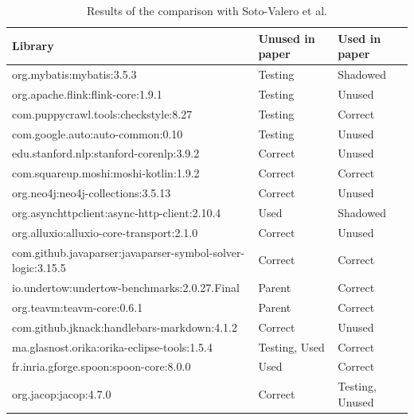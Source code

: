 \begin{table}[ht!]
\begin{center}
\begin{tabular}{|l|l|l|}
\hline
\textbf{Library} & \textbf{Unused in paper} & \textbf{Used in paper} \\ \hline
org.mybatis:mybatis:3.5.3                                   & Testing       & Shadowed        \\ \hline
org.apache.flink:flink-core:1.9.1                           & Testing       & Unused          \\ \hline
com.puppycrawl.tools:checkstyle:8.27                        & Testing       & Correct         \\ \hline
com.google.auto:auto-common:0.10                            & Testing       & Unused          \\ \hline
edu.stanford.nlp:stanford-corenlp:3.9.2                     & Correct       & Unused          \\ \hline
com.squareup.moshi:moshi-kotlin:1.9.2                       & Correct       & Correct         \\ \hline
org.neo4j:neo4j-collections:3.5.13                          & Correct       & Unused          \\ \hline
org.asynchttpclient:async-http-client:2.10.4                & Used          & Shadowed        \\ \hline
org.alluxio:alluxio-core-transport:2.1.0                    & Correct       & Unused          \\ \hline
com.github.javaparser:javaparser-symbol-solver-logic:3.15.5 & Correct       & Correct         \\ \hline
io.undertow:undertow-benchmarks:2.0.27.Final                & Parent        & Correct         \\ \hline
org.teavm:teavm-core:0.6.1                                  & Parent        & Correct         \\ \hline
com.github.jknack:handlebars-markdown:4.1.2                 & Correct       & Unused          \\ \hline
ma.glasnost.orika:orika-eclipse-tools:1.5.4                 & Testing, Used & Correct         \\ \hline
fr.inria.gforge.spoon:spoon-core:8.0.0                      & Used          & Correct         \\ \hline
org.jacop:jacop:4.7.0                                       & Correct       & Testing, Unused \\ \hline
\end{tabular}
\end{center}
\caption{Results of the comparison with Soto-Valero et al. \cite{soto2020comprehensive}}
\label{table:comparison-results}
\end{table}

